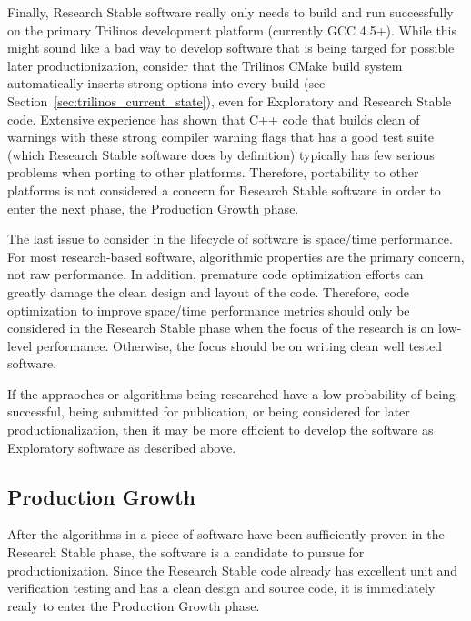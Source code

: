 \documentclass[11pt]{SANDreport}
\begin{document}
Finally, Research Stable software really only needs to build and run
successfully on the primary Trilinos development platform (currently
GCC 4.5+).  While this might sound like a bad way to develop software
that is being targed for possible later productionization, consider
that the Trilinos CMake build system automatically inserts strong
options into every build (see
Section~\ref{sec:trilinos_current_state}), even for Exploratory and
Research Stable code.  Extensive experience has shown that C++ code
that builds clean of warnings with these strong compiler warning flags
that has a good test suite (which Research Stable software does by
definition) typically has few serious problems when porting to other
platforms.  Therefore, portability to other platforms is not
considered a concern for Research Stable software in order to enter
the next phase, the Production Growth phase.

The last issue to consider in the lifecycle of software is space/time
performance.  For most research-based software, algorithmic properties
are the primary concern, not raw performance.  In addition, premature
code optimization efforts can greatly damage the clean design and
layout of the code.  Therefore, code optimization to improve
space/time performance metrics should only be considered in the
Research Stable phase when the focus of the research is on low-level
performance.  Otherwise, the focus should be on writing clean well
tested software.

If the appraoches or algorithms being researched have a low
probability of being successful, being submitted for publication, or
being considered for later productionalization, then it may be more
efficient to develop the software as Exploratory software as described
above.


%
{}\subsection{Production Growth}
%

After the algorithms in a piece of software have been sufficiently
proven in the Research Stable phase, the software is a candidate to
pursue for productionization.  Since the Research Stable code already
has excellent unit and verification testing and has a clean design and
source code, it is immediately ready to enter the Production Growth
phase.
\end{document}
